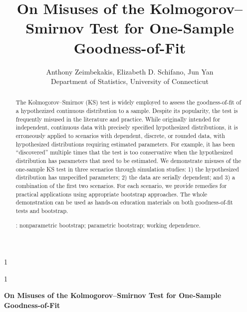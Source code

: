 \documentclass[12pt, letterpaper]{article}
\newcommand{\blind}{1}
\begin{document}

\blind
{
  \title{\bf On Misuses of the Kolmogorov--Smirnov Test for One-Sample 
	Goodness-of-Fit}
  \author{Anthony Zeimbekakis, %
  Elizabeth D. Schifano, %
  Jun Yan\\[1ex]
  Department of Statistics, University of Connecticut\\
}
\date{}
  \maketitle
} \fi

\blind
{
  \bigskip
  \bigskip
  \bigskip
  \begin{center}
    {\LARGE\bf On Misuses of the Kolmogorov--Smirnov Test for One-Sample 
	Goodness-of-Fit}
\end{center}
  \bigskip
} \fi


\doublespace

\begin{abstract}
The Kolmogorov--Smirnov (KS) test is widely employed to assess the
goodness-of-fit of a hypothezized continuous distribution to a sample.
Despite its popularity, the test is frequently misused in the literature and
practice. While originally intended for independent, continuous data with
precisely specified hypothesized distributions, it is erroneously applied to
scenarios with dependent, discrete, or rounded data, with hypothesized
distributions requiring estimated parameters. For example, it has been
``discovered'' multiple times that the test is too conservative when the 
hypothesized distribution has parameters that need to be estimated.
We demonstrate misuses of the one-sample KS test in
three scenarios through simulation studies:
1) the hypothesized distribution has unspecified parameters;
2) the data are serially dependent; and
3) a combination of the first two scenarios.
For each scenario, we provide remedies for practical applications using
appropriate bootstrap approaches.
The whole demonstration can be used as hands-on education materials on both
goodness-of-fit tests and bootstrap.

\bigskip
{}:
nonparametric bootstrap;
parametric bootstrap;
working dependence.
\end{abstract}
\end{document}
